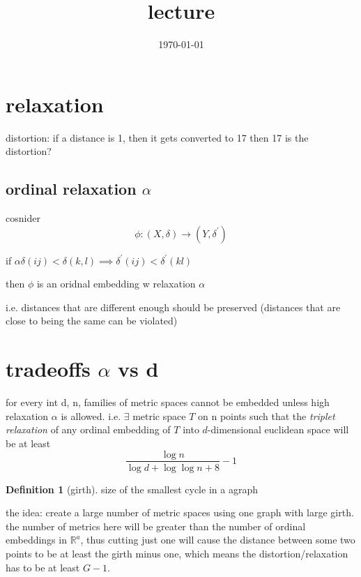 \documentclass{article}
\title{lecture}
\date{\today}
\theoremstyle{definition}
\newtheorem{definition}{Definition}
\begin{document}
\maketitle

\section{relaxation}

distortion: if a distance is 1, then it gets converted to 17 then 17 is the distortion?

\subsection{ordinal relaxation \(\alpha\)}

cosnider \begin{equation}
    \phi:(X,\delta)\to (Y,\delta^\prime)
\end{equation}

if \(\alpha\delta(ij)<\delta(k,l)\implies\delta^\prime(ij)<\delta^\prime(kl)\)

then \(\phi\) is an oridnal embedding w relaxation \(\alpha\)

i.e. distances that are different enough should be preserved (distances that are close to being the same can be violated)


\section{tradeoffs \(\alpha\) vs d}

for every int d, n, families of metric spaces cannot be embedded unless high relaxation \(\alpha\) is allowed. i.e. \(\exists \) metric space \(T\) on n points such that the \emph{triplet relaxation } of any ordinal embedding of \(T\) into \(d\)-dimensional euclidean space will be at least \begin{equation}
    \frac{\log n}{\log d + \log\log n+8}-1
\end{equation}


\begin{definition}[girth]
    size of the smallest cycle in a agraph
\end{definition}


the idea:
create a large number of metric spaces using one graph with large girth. the number of metrics here will be greater than the number of ordinal embeddings in \(\mathbb R^a\), thus cutting just one will cause the distance between some two points to be at least the girth minus one, which means the distortion/relaxation has to be at least \(G-1\). 
\end{document}
